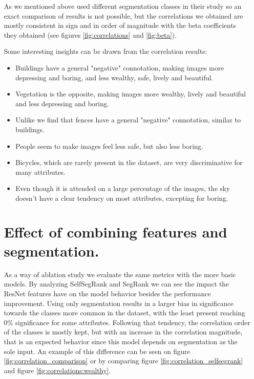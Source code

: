 As we mentioned above  used different segmentation classes
in their study so an exact comparison of results is not possible, but the correlations we obtained
are mostly consistent in sign and in order of magnitude with the beta coefficients they
obtained (see figures \ref{fig:correlations} and \ref{fig:beta}).

Some interesting insights can be drawn from the correlation results:

\begin{itemize}
	\item Buildings have a general "negative" connotation, making images more depressing and
	boring, and less wealthy, safe, lively and beautiful.
	\item Vegetation is the opposite, making images more wealthy, lively and beautiful and less
	depressing and boring.
	\item Unlike \cite{rossetti} we find that fences have a general "negative" connotation,
	similar to buildings.
	\item People seem to make images feel less safe, but also less boring.
	\item Bicycles, which are rarely present in the dataset, are very discriminative for
	many attributes.
	\item Even though it is attended on a large percentage of the images, the sky doesn't have
	a clear tendency on most attributes, excepting for boring.
\end{itemize}

\section{Effect of combining features and segmentation.}

As a way of ablation study we evaluate the same metrics with the more basic models.
By analyzing SelfSegRank and SegRank we can see the impact the ResNet features have on the model  behavior
besides the performance improvement.
Using only segmentation results in a larger bias in significance towards the classes more
common in the dataset, with the least present reaching 0\% significance for some attributes.
Following that tendency, the correlation order of the classes is mostly kept, but with an
increase in the correlation magnitude, that is an expected behavior since this model depends on segmentation as
the sole input. An example of this difference can be seen on figure \ref{fig:correlation_comparison}  or
by comparing figure \ref{fig:correlation_selfsegrank} and figure \ref{fig:correlations:wealthy}.

